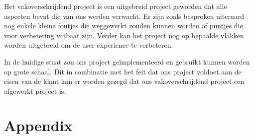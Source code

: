 \documentclass[pdftex,a4paper,12pt,twoside]{report}
\begin{document}
Het vakoverschrijdend project is een uitgebreid project geworden dat alle aspecten bevat die van ons werden verwacht. Er zijn zoals besproken uiteraard nog enkele kleine foutjes die weggewerkt zouden kunnen worden of puntjes die voor verbetering vatbaar zijn. Verder kan het project nog op bepaalde vlakken worden uitgebreid om de user-experience te verbeteren.

In de huidige staat zou ons project geïmplementeerd en gebruikt kunnen worden op grote schaal. Dit in combinatie met het feit dat ons project voldoet aan de eisen van de klant kan er worden gezegd dat ons vakoverschrijdend project een afgewerkt project is.




\clearpage
{}
\listoffigures


\appendix
\chapter{Appendix}



\end{document}
